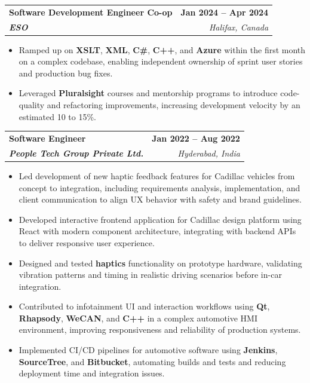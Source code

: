 \documentclass[letterpaper,11pt]{article}
\makeatletter
\newcommand{\resumeItem}[1]{
  \item\small{
    {#1 \vspace{-2pt}}
  }
}
\newcommand{\resumeSubheading}[4]{
  \vspace{-2pt}\item
    \begin{tabular*}{1.0\textwidth}[t]{l@{\extracolsep{\fill}}r}
      \textbf{#1} & \textbf{\small #2} \\
      \textit{\small#3} & \textit{\small #4} \\
    \end{tabular*}\vspace{-7pt}
}
\newcommand{\resumeItemListStart}{\begin{itemize}}
\newcommand{\resumeItemListEnd}{\end{itemize}\vspace{-5pt}}
\makeatother
\begin{document}
    \resumeSubheading
      {\textbf{Software Development Engineer Co-op}}{\textbf{Jan 2024 -- Apr 2024}}
      {\textbf{ESO}}{Halifax, Canada}
      \resumeItemListStart
        \resumeItem{Ramped up on \textbf{XSLT}, \textbf{XML}, \textbf{C\#}, \textbf{C++}, and \textbf{Azure} within the first month on a complex codebase, enabling independent ownership of sprint user stories and production bug fixes.}
        \resumeItem{Leveraged \textbf{Pluralsight} courses and mentorship programs to introduce code-quality and refactoring improvements, increasing development velocity by an estimated 10 to 15\%.}
      \resumeItemListEnd

    \resumeSubheading
      {\textbf{Software Engineer}}{\textbf{Jan 2022 -- Aug 2022}}
      {\textbf{People Tech Group Private Ltd.}}{Hyderabad, India}
      \resumeItemListStart
        \resumeItem{Led development of new haptic feedback features for Cadillac vehicles from concept to integration, including requirements analysis, implementation, and client communication to align UX behavior with safety and brand guidelines.}
        \resumeItem{Developed interactive frontend application for Cadillac design platform using React with modern component architecture, integrating with backend APIs to deliver responsive user experience.}
        \resumeItem{Designed and tested \textbf{haptics} functionality on prototype hardware, validating vibration patterns and timing in realistic driving scenarios before in-car integration.}
        \resumeItem{Contributed to infotainment UI and interaction workflows using \textbf{Qt}, \textbf{Rhapsody}, \textbf{WeCAN}, and \textbf{C++} in a complex automotive HMI environment, improving responsiveness and reliability of production systems.}
        \resumeItem{Implemented CI/CD pipelines for automotive software using \textbf{Jenkins}, \textbf{SourceTree}, and \textbf{Bitbucket}, automating builds and tests and reducing deployment time and integration issues.}
      \resumeItemListEnd
\end{document}
